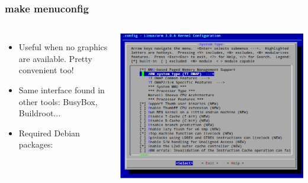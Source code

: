 \begin{frame}
  \frametitle{make menuconfig}
  \begin{columns}
    \begin{itemize}
      \item Useful when no graphics are available. Pretty convenient too!
      \item Same interface found in other tools: BusyBox, Buildroot...
      \item Required Debian packages: 
    \end{itemize}
    \includegraphics[width=\textwidth]{slides/sysdev-kernel-building/menuconfig-screenshot.png}
  \end{columns}
\end{frame}

